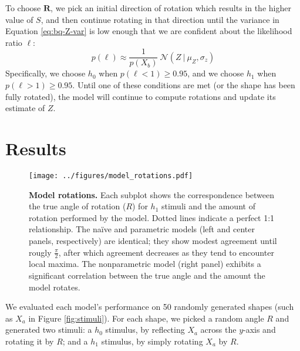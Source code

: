 \documentclass{article} %
\newcommand{\naive}[0]{na\"ive}
\begin{document}
To choose $\mathbf{R}$, we pick an initial direction of rotation which
results in the higher value of $S$, and then continue rotating in that
direction until the variance in Equation \ref{eq:bq-Z-var} is low
enough that we are confident about the likelihood ratio $\ell$:
\begin{equation*}
p(\ell)\approx\frac{1}{p(X_b)}\ \mathcal{N}(Z\ \vert\ \mu_Z, \sigma_z)
\end{equation*}
Specifically, we choose $h_0$ when $p(\ell < 1)\geq 0.95$, and we
choose $h_1$ when $p(\ell > 1)\geq 0.95$. Until one of these
conditions are met (or the shape has been fully rotated), the model
will continue to compute rotations and update its estimate of $Z$.

\section{Results}

\begin{figure}[t]
  \centering
  \texttt{[image: ../figures/model\_rotations.pdf]}
  \caption{\textbf{Model rotations.} Each subplot shows the
    correspondence between the true angle of rotation ($R$) for $h_1$
    stimuli and the amount of rotation performed by the model. Dotted
    lines indicate a perfect 1:1 relationship. The \naive{} and
    parametric models (left and center panels, respectively) are
    identical; they show modest agreement until rougly
    $\frac{\pi}{2}$, after which agreement decreases as they tend to
    encounter local maxima. The nonparametric model (right panel)
    exhibits a significant correlation between the true angle and the
    amount the model rotates.}
  \label{fig:rotations}
\end{figure}

We evaluated each model's performance on 50 randomly generated shapes
(such as $X_a$ in Figure \ref{fig:stimuli}). For each shape, we picked
a random angle $R$ and generated two stimuli: a $h_0$ stimulus, by
reflecting $X_a$ across the $y$-axis and rotating it by $R$; and a
$h_1$ stimulus, by simply rotating $X_a$ by $R$.
\end{document}
